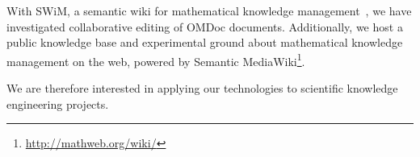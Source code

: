 \begin{background}With SWiM, a semantic wiki for mathematical knowledge
management~\cite{lange:swim-demo08}, we have investigated collaborative editing
of OMDoc documents.  Additionally, we host a public knowledge base and
experimental ground about mathematical knowledge management on the web, powered
by Semantic MediaWiki\footnote{\url{http://mathweb.org/wiki/}}.\end{background}      We
are therefore interested in applying our technologies to scientific knowledge
engineering projects.


